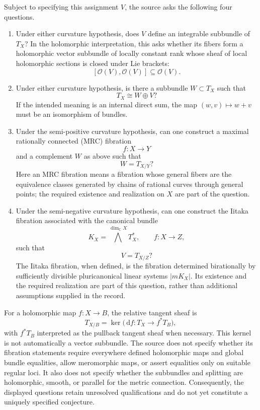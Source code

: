 \documentclass[11pt]{article}
\newcommand{\C}{\mathbb{C}}
\newcommand{\dd}{\,\mathrm{d}}
\begin{document}
Subject to specifying this assignment \(V\), the source asks the following four questions.
\begin{enumerate}
\item Under either curvature hypothesis, does \(V\) define an integrable subbundle of \(T_X\)? In the holomorphic interpretation, this asks whether its fibers form a holomorphic vector subbundle of locally constant rank whose sheaf of local holomorphic sections is closed under Lie brackets:
\[
[\mathcal O(V),\mathcal O(V)]\subseteq\mathcal O(V).
\]
\item Under either curvature hypothesis, is there a subbundle \(W\subset T_X\) such that
\[
T_X\cong W\oplus V?
\]
If the intended meaning is an internal direct sum, the map \((w,v)\mapsto w+v\) must be an isomorphism of bundles.
\item Under the semi-positive curvature hypothesis, can one construct a maximal rationally connected (MRC) fibration
\[
f\colon X\longrightarrow Y
\]
and a complement \(W\) as above such that
\[
W=T_{X/Y}?
\]
Here an MRC fibration means a fibration whose general fibers are the equivalence classes generated by chains of rational curves through general points; the required existence and realization on \(X\) are part of the question.
\item Under the semi-negative curvature hypothesis, can one construct the Iitaka fibration associated with the canonical bundle
\[
K_X=\bigwedge^{\dim_{\C}X}T_X^*,\qquad f\colon X\longrightarrow Z,
\]
such that
\[
V=T_{X/Z}?
\]
The Iitaka fibration, when defined, is the fibration determined birationally by sufficiently divisible pluricanonical linear systems \(\lvert mK_X\rvert\). Its existence and the required realization are part of this question, rather than additional assumptions supplied in the record.
\end{enumerate}
For a holomorphic map \(f\colon X\to B\), the relative tangent sheaf is
\[
T_{X/B}=\ker\bigl(\dd f\colon T_X\to f^*T_B\bigr),
\]
with \(f^*T_B\) interpreted as the pullback tangent sheaf when necessary. This kernel is not automatically a vector subbundle. The source does not specify whether its fibration statements require everywhere defined holomorphic maps and global bundle equalities, allow meromorphic maps, or assert equalities only on suitable regular loci. It also does not specify whether the subbundles and splitting are holomorphic, smooth, or parallel for the metric connection. Consequently, the displayed questions retain unresolved qualifications and do not yet constitute a uniquely specified conjecture.
\end{document}
